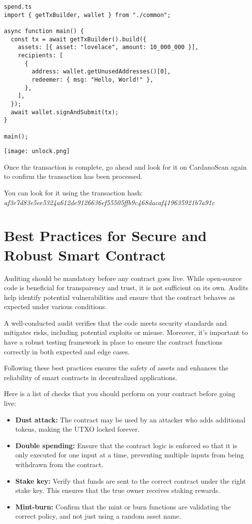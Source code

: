 \begin{verbatim}
spend.ts
import { getTxBuilder, wallet } from "./common";
 
async function main() {
  const tx = await getTxBuilder().build({
    assets: [{ asset: "lovelace", amount: 10_000_000 }],
    recipients: [
      {
        address: wallet.getUnusedAddresses()[0],
        redeemer: { msg: "Hello, World!" },
      },
    ],
  });
  await wallet.signAndSubmit(tx);
}
 
main();
\end{verbatim}
\texttt{[image: unlock.png]}



Once the transaction is complete, go ahead and look for it on CardanoScan again to confirm the transaction has been processed.

You can look for it using the transaction hash: \textit{af3e7d83e5ee5324a612de9126636ef55505ffb9c468dacaf419635921b7a91c}


\section{Best Practices for Secure and Robust Smart Contract}

Auditing should be mandatory before any contract goes live. While open-source code is beneficial for transparency and trust, it is not sufficient on its own. Audits help identify potential vulnerabilities and ensure that the contract behaves as expected under various conditions. 

A well-conducted audit verifies that the code meets security standards and mitigates risks, including potential exploits or misuse. Moreover, it's important to have a robust testing framework in place to ensure the contract functions correctly in both expected and edge cases.

Following these best practices ensures the safety of assets and enhances the reliability of smart contracts in decentralized applications.

Here is a list of checks that you should perform on your contract before going live:

\begin{itemize}
    \item \textbf{Dust attack:} The contract may be used by an attacker who adds additional tokens, making the UTXO locked forever.
    \item \textbf{Double spending:} Ensure that the contract logic is enforced so that it is only executed for one input at a time, preventing multiple inputs from being withdrawn from the contract.
    \item \textbf{Stake key:} Verify that funds are sent to the correct contract under the right stake key. This ensures that the true owner receives staking rewards.
    \item \textbf{Mint-burn:} Confirm that the mint or burn functions are validating the correct policy, and not just using a random asset name.
\end{itemize}

